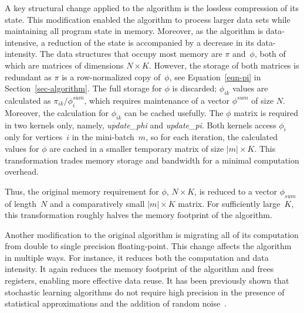 A key structural change applied to the algorithm is the lossless compression of
its state. This modification enabled the algorithm to process larger data sets
while maintaining all program state in memory. Moreover, as the algorithm is
data-intensive, a reduction of the state is accompanied by a decrease in its
data-intensity.
%
The data structures that occupy most memory are $\pi$ and~$\phi$, both of
which are matrices of dimensions ${N}\times{K}$. However, the storage of both
matrices is redundant as $\pi$ is a row-normalized copy of~$\phi$, see
Equation~\ref{eqn-pi} in Section~\ref{sec-algorithm}. The full storage for
$\phi$ is discarded; $\phi_{ik}$ values are calculated as
$\pi_{ik}/\phi^{sum}_i$, which requires maintenance of a vector
$\phi^{sum}$ of size $N$.
Moreover, the calculation for $\phi_{ik}$ can be cached usefully.
%
The $\phi$ matrix is required in two kernels only, namely, \textit{update\_phi} and
\textit{update\_pi}. Both kernels access $\phi_i$ only for vertices~$i$ in the
mini-batch~$m$, so for each iteration, the calculated values for $\phi$ are cached
in a smaller temporary matrix of size
${|m|}\times{K}$.
%
%
This transformation trades memory storage and
bandwidth for a minimal computation overhead.
%

Thus, the original memory requirement for $\phi$, ${N}\times{K}$, is
reduced to a vector $\phi_{sum}$ of length~$N$ and a comparatively small
${|m|}\times{K}$ matrix. For sufficiently large~$K$, this transformation roughly
halves the memory footprint of the algorithm.

Another modification to the original algorithm is migrating all of its
computation from double to single precision floating-point.
%
This change affects the algorithm in multiple ways. For instance, it reduces
both the computation and data intensity. It again reduces the memory
footprint of the algorithm and frees registers, enabling more
effective data reuse.
%
It has been previously shown that stochastic learning algorithms do not require
high precision in the presence of statistical approximations and the addition
of random noise~\cite{DBLP:journals/corr/GuptaAGN15}.

